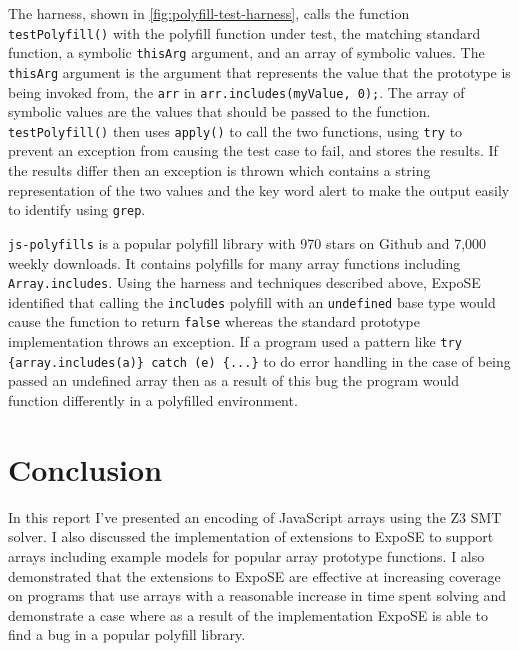 \documentclass[]{final_report}
\begin{document}
The harness, shown in \ref{fig:polyfill-test-harness}, calls the function \lstinline|testPolyfill()| with the polyfill function under test, the matching standard function, a symbolic \lstinline|thisArg| argument, and an array of symbolic values. The \lstinline|thisArg| argument is the argument that represents the value that the prototype is being invoked from, the \lstinline|arr| in \lstinline|arr.includes(myValue, 0);|. The array of symbolic values are the values that should be passed to the function. \lstinline|testPolyfill()| then uses \lstinline|apply()| to call the two functions, using \lstinline|try| to prevent an exception from causing the test case to fail, and stores the results. If the results differ then an exception is thrown which contains a string representation of the two values and the key word alert to make the output easily to identify using \lstinline|grep|.

\lstinline|js-polyfills| is a popular polyfill library with 970 stars on Github and 7,000 weekly downloads. It contains polyfills for many array functions including \lstinline|Array.includes|. Using the harness and techniques described above, ExpoSE identified that calling the \lstinline|includes| polyfill with an \lstinline|undefined| base type would cause the function to return \lstinline|false| whereas the standard prototype implementation throws an exception. If a program used a pattern like \lstinline|try {array.includes(a)} catch (e) {...}| to do error handling in the case of being passed an undefined array then as a result of this bug the program would function differently in a polyfilled environment.

\section{Conclusion}
In this report I've presented an encoding of JavaScript arrays using the Z3 SMT solver. I also discussed the implementation of extensions to ExpoSE to support arrays including example models for popular array prototype functions. I also demonstrated that the extensions to ExpoSE are effective at increasing coverage on programs that use arrays with a reasonable increase in time spent solving and demonstrate a case where as a result of the implementation ExpoSE is able to find a bug in a popular polyfill library.
\end{document}
